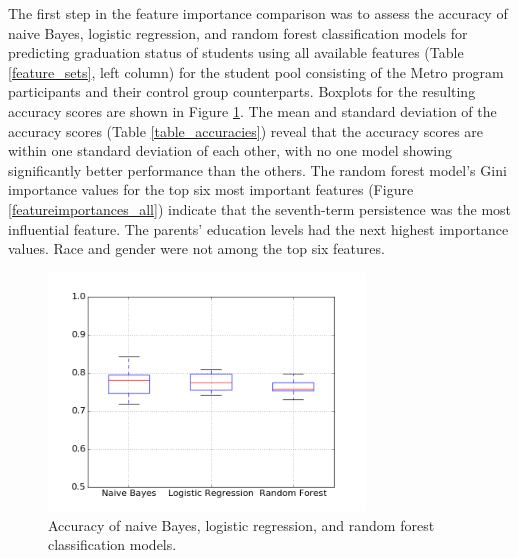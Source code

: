 The first step in the feature importance comparison was to assess the accuracy of naive Bayes, logistic regression, and random forest classification models for predicting graduation status of students using all available features (Table \ref{feature_sets}, left column) for the student pool consisting of the Metro program participants and their control group counterparts.  Boxplots for the resulting accuracy scores are shown in Figure \ref{accuracies_all}.  The mean and standard deviation of the accuracy scores (Table \ref{table_accuracies}) reveal that the accuracy scores are within one standard deviation of each other, with no one model showing significantly better performance than the others.  The random forest model's Gini importance values for the top six most important features (Figure \ref{featureimportances_all}) indicate that the seventh-term persistence was the most influential feature.  The parents' education levels had the next highest importance values.  Race and gender were not among the top six features.   

\begin{figure}[htbp]
\centering
\includegraphics[width=0.75\textwidth]{figures/accuracies_all_metrocomp.png}
\caption{Accuracy of naive Bayes, logistic regression, and random forest classification models.}
\label{accuracies_all}
\end{figure}

